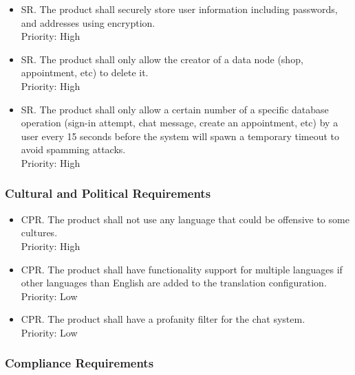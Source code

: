 \documentclass[12pt]{article}
\newcounter{prnum} %
\newcounter{srnum} %
\newcounter{cprnum} %
\begin{document}
\begin {itemize}
    \item[SR\refstepcounter{srnum}\thesrnum \label{R_Output}.] The product shall securely store user information including passwords, and addresses using encryption.\\
    Priority: High
    
     \item[SR\refstepcounter{srnum}\thesrnum \label{R_Output}.] The product shall only allow the creator of a data node (shop, appointment, etc) to delete it.\\
     Priority: High
     
     \item[SR\refstepcounter{srnum}\thesrnum \label{R_Output}.] The product shall only allow a certain number of a specific database operation (sign-in attempt, chat message, create an appointment, etc) by a user every 15 seconds before the system will spawn a temporary timeout to avoid spamming attacks.\\
     Priority: High
\end {itemize}

\subsubsection{Cultural and Political Requirements}

\begin {itemize}
    \item[CPR\refstepcounter{cprnum}\thecprnum \label{R_Output}.] The product shall not use any language that could be offensive to some cultures.\\
    Priority: High
    
    \item[CPR\refstepcounter{cprnum}\thecprnum \label{R_Output}.] The product shall have functionality support for multiple languages if other languages than English are added to the translation configuration.\\
    Priority: Low
    
    \item[CPR\refstepcounter{cprnum}\thecprnum \label{R_Output}.] The product shall have a profanity filter for the chat system.\\
Priority: Low
\end {itemize}

\subsubsection{Compliance Requirements}
\end{document}
